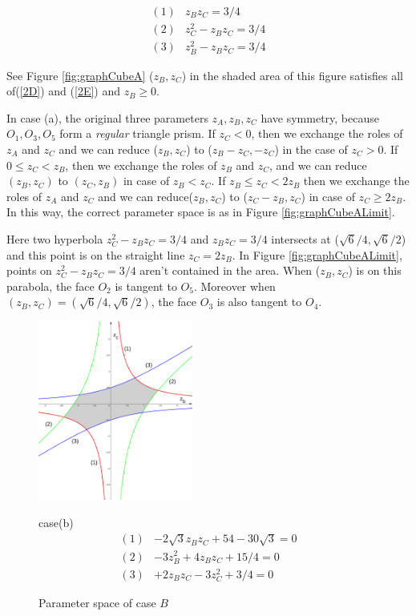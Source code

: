 \documentclass[suppldata, dvipdfmx]{interact}
\theoremstyle{plain}%
\theoremstyle{definition}
\theoremstyle{remark}
\theoremstyle{problemstyle}
\begin{document}
\begin{align*}
(1)& z_Bz_C = 3/4\\
(2)& z_C^2 - z_B z_C = 3/4\\
(3)& z_B^2 - z_B z_C = 3/4
\end{align*}

See Figure \ref{fig:graphCubeA} ($z_B, z_C$) in the shaded area of this figure satisfies
all of(\ref{2D}) and (\ref{2E}) and $z_B \geq 0$.

In case (a), the original three parameters $z_A, z_B, z_C$ have symmetry,
because $O_1, O_3, O_5$ form a \textit{regular} triangle prism.
If $z_C < 0$, then we exchange the roles of $z_A$ and $z_C$ and we can reduce
($z_B, z_C$) to ($z_B - z_C, -z_C$) in the case of $z_C > 0$.
If $0 \leq z_C < z_B$, then we exchange the roles of $z_B$ and $z_C$, 
and we can reduce $(z_B, z_C)$ to $(z_C, z_B)$ in case of 
$z_B < z_C$. If $z_B \leq z_C < 2z_B$ then we exchange the roles of
$z_A$ and $z_C$ and we can reduce($z_B, z_C$) to ($z_C-z_B,z_C$) in case
of $z_C \geq 2z_B$. In this way, the correct parameter space is as in
Figure \ref{fig:graphCubeALimit}.

Here two hyperbola $z^2_C - z_Bz_C = 3/4$ and $z_B z_C = 3/4$ intersects
at ($\sqrt{6} / 4, \sqrt{6}/2$) and this point is on the straight line
$z_C=2z_B$. In Figure \ref{fig:graphCubeALimit}, points on $z^2_C - z_Bz_C = 3/4$ aren't
contained in the area. When ($z_B, z_C$) is on this parabola, the face
$O_2$ is tangent to $O_5$. Moreover when
$(z_B, z_C) = (\sqrt{6} / 4, \sqrt{6}/2)$, the face $O_3$ is also tangent
to $O_4$.

\begin{figure}[h!tbp]
 \begin{minipage}[]{0.5\textwidth}
 \centering
 \includegraphics[width=2in,
 keepaspectratio]{./img/graph/cubeB.jpg}
 \caption{Parameter space of case $B$}
 \label{fig:graphCubeB}
 \end{minipage}
 \hspace*{\fill}
 \begin{minipage}[]{0.5\textwidth}
  case(b)
  \centering
  \begin{align*}
   (1)& -2\sqrt{3} z_B z_C + 54 - 30\sqrt{3} = 0\\
   (2)& -3z_B^2 + 4 z_B z_C + 15/4 = 0\\
   (3)& +2z_B z_C - 3z_C^2 + 3/4 = 0
  \end{align*}
 \end{minipage}
\end{figure}
\end{document}
